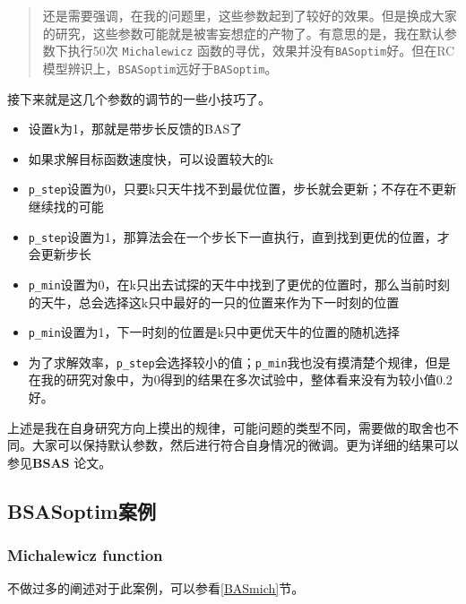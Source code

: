 \documentclass[]{ctexbook}
\providecommand{\tightlist}{%
  \setlength{\itemsep}{0pt}\setlength{\parskip}{0pt}}
\theoremstyle{definition}
\theoremstyle{definition}
\theoremstyle{definition}
\theoremstyle{remark}
\begin{document}
\begin{quote}
还是需要强调，在我的问题里，这些参数起到了较好的效果。但是换成大家的研究，这些参数可能就是被害妄想症的产物了。有意思的是，我在默认参数下执行50次
\texttt{Michalewicz}
函数的寻优，效果并没有\texttt{BASoptim}好。但在RC模型辨识上，\texttt{BSASoptim}远好于\texttt{BASoptim}。
\end{quote}

接下来就是这几个参数的调节的一些小技巧了。

\begin{itemize}
\tightlist
\item
  设置\texttt{k}为1，那就是带步长反馈的BAS了
\item
  如果求解目标函数速度快，可以设置较大的k
\item
  \texttt{p\_step}设置为0，只要k只天牛找不到最优位置，步长就会更新；不存在不更新继续找的可能
\item
  \texttt{p\_step}设置为1，那算法会在一个步长下一直执行，直到找到更优的位置，才会更新步长
\item
  \texttt{p\_min}设置为0，在k只出去试探的天牛中找到了更优的位置时，那么当前时刻的天牛，总会选择这k只中最好的一只的位置来作为下一时刻的位置
\item
  \texttt{p\_min}设置为1，下一时刻的位置是k只中更优天牛的位置的随机选择
\item
  为了求解效率，\texttt{p\_step}会选择较小的值；\texttt{p\_min}我也没有摸清楚个规律，但是在我的研究对象中，为0得到的结果在多次试验中，整体看来没有为较小值0.2好。
\end{itemize}

上述是我在自身研究方向上摸出的规律，可能问题的类型不同，需要做的取舍也不同。大家可以保持默认参数，然后进行符合自身情况的微调。更为详细的结果可以参见\textbf{BSAS}
\citep{Wang2018BSAS}论文。

\subsection{BSASoptim案例}\label{BSASexample}

\subsubsection{Michalewicz function}\label{michalewicz-function}

不做过多的阐述对于此案例，可以参看\ref{BASmich}节。
\end{document}
